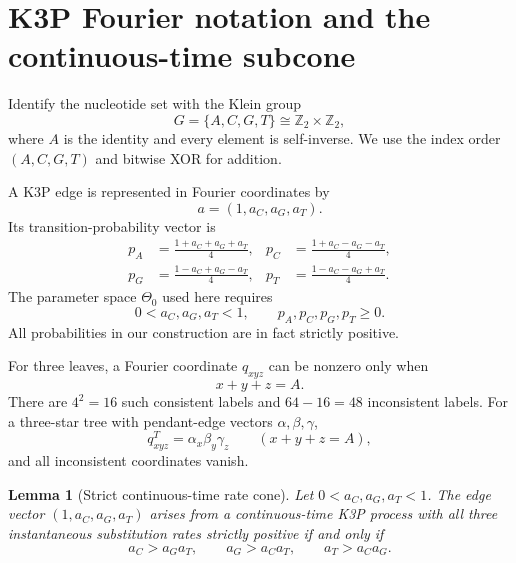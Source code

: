 \documentclass[11pt]{article}
\newtheorem{lemma}[theorem]{Lemma}
\theoremstyle{remark}
\newcommand{\ThetaZero}{\Theta_{0}}
\begin{document}
\section{K3P Fourier notation and the continuous-time subcone}

Identify the nucleotide set with the Klein group
\[
  G=\{A,C,G,T\}\cong \mathbb{Z}_2\times\mathbb{Z}_2,
\]
where $A$ is the identity and every element is self-inverse.  We use the index order $(A,C,G,T)$ and bitwise XOR for addition.

A K3P edge is represented in Fourier coordinates by
\[
  a=(1,a_C,a_G,a_T).
\]
Its transition-probability vector is
\begin{equation}\label{eq:inverse-edge}
\begin{aligned}
 p_A&=\frac{1+a_C+a_G+a_T}{4},&
 p_C&=\frac{1+a_C-a_G-a_T}{4},\\
 p_G&=\frac{1-a_C+a_G-a_T}{4},&
 p_T&=\frac{1-a_C-a_G+a_T}{4}.
\end{aligned}
\end{equation}
The parameter space $\ThetaZero$ used here requires
\[
  0<a_C,a_G,a_T<1,
  \qquad p_A,p_C,p_G,p_T\geq 0.
\]
All probabilities in our construction are in fact strictly positive.

For three leaves, a Fourier coordinate $q_{xyz}$ can be nonzero only when
\[
  x+y+z=A.
\]
There are $4^2=16$ such consistent labels and $64-16=48$ inconsistent labels.  For a three-star tree with pendant-edge vectors $\alpha,\beta,\gamma$,
\begin{equation}\label{eq:tree-param}
  q^{T}_{xyz}=\alpha_x\beta_y\gamma_z
  \qquad (x+y+z=A),
\end{equation}
and all inconsistent coordinates vanish.

\begin{lemma}[Strict continuous-time rate cone]\label{lem:ct-cone}
Let $0<a_C,a_G,a_T<1$.  The edge vector $(1,a_C,a_G,a_T)$ arises from a continuous-time K3P process with all three instantaneous substitution rates strictly positive if and only if
\begin{equation}\label{eq:ct-ineq}
  a_C>a_Ga_T,
  \qquad
  a_G>a_Ca_T,
  \qquad
  a_T>a_Ca_G.
\end{equation}
\end{lemma}
\end{document}
